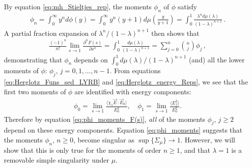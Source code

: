 \documentclass[english,12pt,jmp,graphicx]{revtex4-1}
\begin{document}
By equation \eqref{eq:mh_Stieltjes_rep}, the moments $\phi_n$ of $\phi$
satisfy  
%
\begin{align}\label{eq:phi_moments}
  \phi_n=\int_0^\infty y^nd\phi(y)
    =\int_0^\infty y^n(y+1)d\mu\left(\frac{y}{y+1}\right)
    =\int_0^1\frac{\lambda^nd\mu(\lambda)}{(1-\lambda)^{n+1}}\,.
\end{align}
%
A partial fraction expansion of $\lambda^n/(1-\lambda)^{n+1}$ then shows that
%
\begin{align}\label{eq:phi_moments_F(s)}
  \frac{(-1)^n}{n!}\lim_{s\to1}\frac{\partial^nF(s)}{\partial s^n}=\int_0^1\frac{d\mu(\lambda)}{(1-\lambda)^{n+1}}
                                =\sum_{j=0}^n{n \choose j} \phi_j\,,
\end{align}
%
demonstrating that $\phi_n$ depends on $\int_0^1d\mu(\lambda)/(1-\lambda)^{n+1}$
(and) all the lower moments of $\phi$: $\phi_j$, $j=0,1,\ldots,n-1$.
From equations \eqref{eq:Herglotz_Funs_sed_LYRB} and
\eqref{eq:Herglotz_energy_Reps}, we see that the first two moments of
$\phi$ are identified with energy components:    
%
\begin{align}\label{eq:phi_energy_relations}
  \phi_0=\lim_{s\to1}\frac{\langle\chi_1\vec{E}\cdot\vec{E}_0\rangle}{E_0^2},   \quad
  \phi_1=\lim_{s\to1}\frac{\langle E_f^2\rangle}{E_0^2}.
\end{align}
%
Therefore by equation \eqref{eq:phi_moments_F(s)}, \emph{all} of the
moments $\phi_j$, $j\geq2$ depend on these energy components. Equation
\eqref{eq:phi_moments} suggests that the moments $\phi_n$, $n\geq0$, become
singular as $\sup\{\Sigma_\mu\}\to1$. However, we will show that this is only
true for the moments of order $n\geq1$, and that $\lambda=1$ is a removable
simple singularity under $\mu$. 
\end{document}

